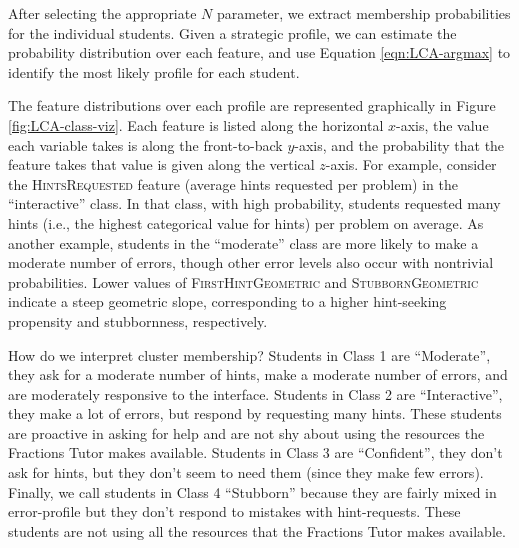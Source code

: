 \documentclass{edm_template}
\newcommand{\ftr}[1]{\textsc{#1}}
\begin{document}
After selecting the appropriate $N$ parameter, we extract membership probabilities for the individual students. Given a strategic profile, we can estimate the probability distribution over each feature, and use Equation \ref{eqn:LCA-argmax} to identify the most likely profile for each student.

The feature distributions over each profile are represented graphically in Figure \ref{fig:LCA-class-viz}. Each feature is listed along the horizontal $x$-axis, the value each variable takes is along the front-to-back $y$-axis, and the probability that the feature takes that value is given along the vertical $z$-axis. For example, consider the \ftr{HintsRequested} feature (average hints requested per problem) in the ``interactive'' class. In that class, with high probability, students requested many hints (i.e., the highest categorical value for hints) per problem on average. As another example, students in the ``moderate'' class are more likely to make a moderate number of errors, though other error levels also occur with nontrivial probabilities. Lower values of \ftr{FirstHintGeometric} and \ftr{StubbornGeometric} indicate a steep geometric slope, corresponding to a higher hint-seeking propensity and stubbornness, respectively.

How do we interpret cluster membership? Students in Class 1 are ``Moderate'', they ask for a moderate number of hints, make a moderate number of errors, and are moderately responsive to the interface. Students in Class 2 are ``Interactive'', they make a lot of errors, but respond by requesting many hints. These students are proactive in asking for help and are not shy about using the resources the Fractions Tutor makes available. Students in Class 3 are ``Confident'', they don't ask for hints, but they don't seem to need them (since they make few errors). Finally, we call students in Class 4 ``Stubborn'' because they are fairly mixed in error-profile but they don't respond to mistakes with hint-requests. These students are not using all the resources that the Fractions Tutor makes available.
\end{document}
